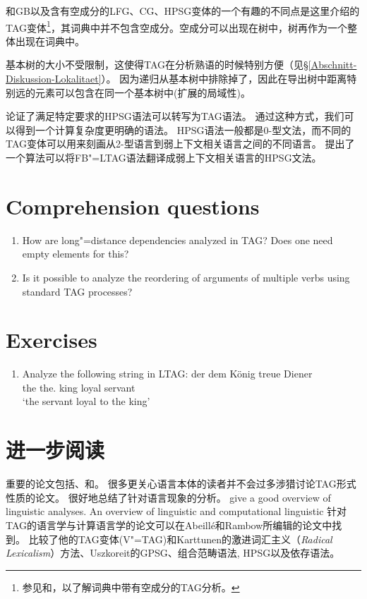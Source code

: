 和GB以及含有空成分的LFG、CG、HPSG变体的一个有趣的不同点是这里介绍的TAG变体\footnote{
  参见和，以了解词典中带有空成分的TAG分析。
}，其词典中并不包含空成分。空成分可以出现在树中，树再作为一个整体出现在词典中。

基本树的大小不受限制，这使得TAG在分析熟语的时候特别方便（见\S \ref{Abschnitt-Diskussion-Lokalitaet}）。
因为递归从基本树中排除掉了，因此在导出树中距离特别远的元素可以包含在同一个基本树中(扩展的局域性)。

\citet*{KKNV95a}论证了满足特定要求的HPSG语法可以转写为TAG语法。
通过这种方式，我们可以得到一个计算复杂度更明确的语法。
HPSG语法一般都是0-型文法，而不同的TAG变体可以用来刻画从2-型语言到弱上下文相关语言之间的不同语言\citep{Joshi85a-u}。
\citet*{YMTT2001a}提出了一个算法可以将FB"=LTAG语法翻译成弱上下文相关语言的HPSG文法。


\section*{Comprehension questions}

\begin{enumerate}
\item How are long"=distance dependencies analyzed in TAG? Does one need empty elements for this?
\item Is it possible to analyze the reordering of arguments of multiple verbs using standard TAG processes?
\end{enumerate} 

\section*{Exercises}

\begin{enumerate}
\item Analyze the following string in LTAG:
\ea
\gll der dem König treue Diener\\
	 the the.\dat{} king loyal servant\\
\glt `the servant loyal to the king'
\z
\end{enumerate}

\section*{进一步阅读}

重要的论文包括、和。
很多更关心语言本体的读者并不会过多涉猎讨论TAG形式性质的论文。
很好地总结了针对语言现象的分析。 give a good overview of linguistic analyses. An overview of linguistic and computational linguistic
针对TAG的语言学与计算语言学的论文可以在Abeill{\'e}和Rambow\nocite{AR2000a-ed-not-crossreferenced}所编辑的论文中找到。
\citet{Rambow94a}比较了他的TAG变体(V"=TAG)和Karttunen的激进词汇主义（\emph{Radical Lexicalism}）方法、Uszkoreit的GPSG\indexgpsg、组合范畴语法\indexcg, HPSG\indexhpsg 以及依存语法\indexdg。 

